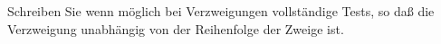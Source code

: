   Schreiben Sie wenn möglich bei Verzweigungen vollständige Tests, so
  daß die Verzweigung unabhängig von der Reihenfolge der Zweige ist.
